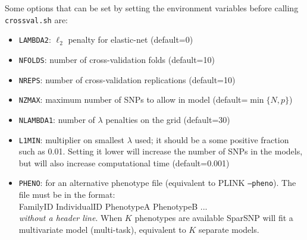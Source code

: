 \documentclass[a4paper,11pt]{article}
\begin{document}
Some options that can be set by setting the environment variables before
calling \texttt{crossval.sh} are:
\begin{itemize}

   \item \texttt{LAMBDA2}: $\ell_2$  penalty for elastic-net (default=0)

   \item \texttt{NFOLDS}: number of cross-validation folds (default=10)

   \item \texttt{NREPS}: number of cross-validation replications (default=10)

   \item \texttt{NZMAX}: maximum number of SNPs to allow in model
   (default=$\min \{N, p \}$)

   \item \texttt{NLAMBDA1}: number of $\lambda$ penalties on the grid
   (default=30)

   \item \texttt{L1MIN}: multiplier on smallest $\lambda$ used; it should
   be a some positive fraction such as 0.01. Setting it lower will increase
   the number of SNPs in the models, but will also increase computational time
   (default=0.001)

   \item \texttt{PHENO}: for an alternative phenotype file (equivalent to PLINK
   \texttt{--pheno}). The file must be in the format:\\
   FamilyID IndividualID PhenotypeA PhenotypeB ... \\
   \emph{without a header line}.
   When $K$ phenotypes are available SparSNP will fit a multivariate
   model (multi-task), equivalent to $K$ separate models.

\end{itemize}



\end{document}
